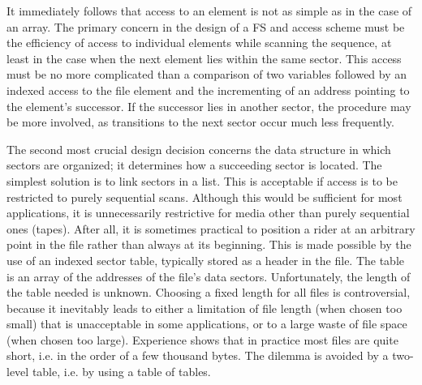 It immediately follows that access to an element is not as simple as in the case of an array. The
primary concern in the design of a FS and access scheme must be the efficiency of
access to individual elements while scanning the sequence, at least in the case when the next
element lies within the same sector. This access must be no more complicated than a
comparison of two variables followed by an indexed access to the file element and the
incrementing of an address pointing to the element's successor. If the successor lies in another
sector, the procedure may be more involved, as transitions to the next sector occur much less
frequently.

The second most crucial design decision concerns the data structure in which sectors are
organized; it determines how a succeeding sector is located. The simplest solution is to link
sectors in a list. This is acceptable if access is to be restricted to purely sequential scans.
Although this would be sufficient for most applications, it is unnecessarily restrictive for media
other than purely sequential ones (tapes). After all, it is sometimes practical to position a rider at
an arbitrary point in the file rather than always at its beginning. This is made possible by the use
of an indexed sector table, typically stored as a header in the file. The table is an array of the
addresses of the file's data sectors. Unfortunately, the length of the table needed is unknown.
Choosing a fixed length for all files is controversial, because it inevitably leads to either a
limitation of file length (when chosen too small) that is unacceptable in some applications, or to a
large waste of file space (when chosen too large). Experience shows that in practice most files
are quite short, i.e. in the order of a few thousand bytes. The dilemma is avoided by a two-level
table, i.e. by using a table of tables.

